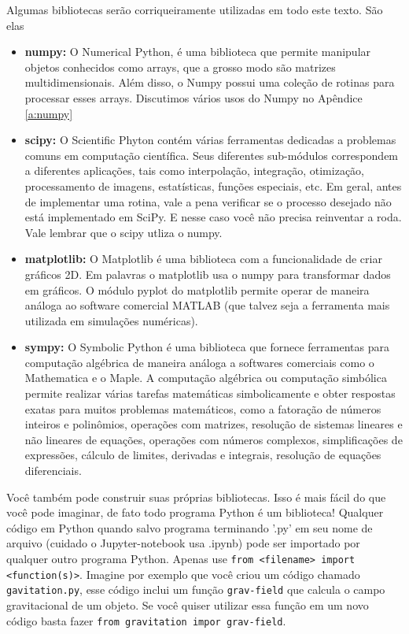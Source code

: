 Algumas bibliotecas serão corriqueiramente utilizadas em todo este texto. São elas

\begin{itemize}
    \item {\bf numpy:} O Numerical Python, é uma biblioteca que permite manipular objetos conhecidos como arrays, que a grosso modo são matrizes multidimensionais. Além disso, o Numpy possui uma coleção de rotinas para processar esses arrays. Discutimos vários usos do Numpy no Apêndice \ref{a:numpy}
    \item {\bf scipy:} O Scientific Phyton contém várias ferramentas dedicadas a problemas comuns em computação científica. Seus diferentes sub-módulos correspondem a diferentes aplicações, tais como interpolação, integração, otimização, processamento de imagens, estatísticas, funções especiais, etc. Em geral, antes de implementar uma rotina, vale a pena verificar se o processo desejado não está implementado em SciPy. E nesse caso você não precisa reinventar a roda. Vale lembrar que o scipy utliza o numpy.
    \item {\bf matplotlib:} O Matplotlib é uma biblioteca com a funcionalidade de criar gráficos 2D. Em palavras o matplotlib usa o numpy para transformar dados em gráficos. O módulo pyplot do matplotlib permite operar de maneira análoga ao software comercial MATLAB (que talvez seja a ferramenta mais utilizada em simulações numéricas).
    \item {\bf sympy:} O Symbolic Python é uma biblioteca que fornece ferramentas para computação algébrica de maneira análoga a softwares comerciais como o Mathematica e o Maple. A computação algébrica ou computação simbólica  permite realizar várias tarefas matemáticas simbolicamente e obter respostas exatas para muitos problemas matemáticos, como a fatoração de números inteiros e polinômios, operações com matrizes, resolução de sistemas lineares e não lineares de equações, operações com números complexos, simplificações de expressões, cálculo de limites, derivadas e integrais, resolução de equações diferenciais.
\end{itemize}

Você também pode construir suas próprias bibliotecas. Isso é mais fácil do que você pode imaginar, de fato todo programa Python é um biblioteca! Qualquer código em Python quando salvo programa terminando '.py' em seu nome de arquivo (cuidado o Jupyter-notebook usa .ipynb) pode ser importado por qualquer outro programa Python. Apenas use {\tt from <filename> import <function(s)>}. Imagine por exemplo que você criou um código chamado {\tt gavitation.py}, esse código inclui um função {\tt grav-field} que calcula o campo gravitacional de um objeto. Se você quiser utilizar essa função em um novo código basta fazer {\tt from gravitation impor grav-field}.

